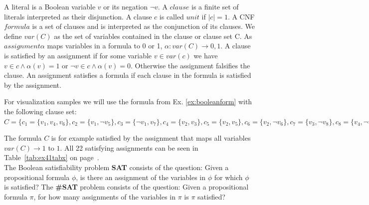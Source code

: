 \documentclass[a4paper, 12pt, bibliography=totoc]{scrartcl}
\begin{document}
A literal is a Boolean variable $v$ or its negation $\neg v$. A $clause$ is a finite set of literals interpreted as their disjunction. A clause $c$ is called $unit$ if $|c|=1$. A CNF $formula$ is a set of clauses and is interpreted as the conjunction of its clauses. We define $var(C)$ as the set of variables contained in the clause or clause set C. As $assignment \alpha$ maps variables in a formula to 0 or 1, $\alpha : var(C)\rightarrow 0,1$. A clause is satisfied by an assignment if for some variable $v \in var(c)$ we have $v \in c \land \alpha (v)=1$ {or} $\neg v \in c \land \alpha(v)=0$. Otherwise the assignment falsifies the clause. An assignment satisfies a formula if each clause in the formula is satisfied by the assignment. \\
\begin{example}\label{ex:example41}
	For visualization samples we will use the formula from Ex. \ref{ex:booleanform} with the following clause set: $C=\{c_{1}=\{v_{1},v_{4},v_{6}\},
	c_{2}=\{v_{1},\neg v_{5}\},
	c_{3}=\{\neg v_{1},v_{7}\},
	c_{4}=\{v_{2},v_{3}\},
	c_{5}=\{v_{2},v_{5}\},
	c_{6}=\{v_{2},\neg v_{6}\},
	c_{7}=\{v_{3},\neg v_{8}\},
	c_{8}=\{v_{4},\neg v_{8}\},
	c_{9}=\{\neg v_{4},v_{6}\},
	c_{10}=\{\neg v_{4},v_{7}\}\}$
\end{example}
\vskip 12pt
The formula $C$ is for example satisfied by the assignment that maps all variables $var(C)\rightarrow 1$ to $1$. 
All 22 satisfying assignments can be seen in Table~\ref{tab:ex41tabx} on page~\pageref{tab:ex41tabx}.\\

The Boolean satisfiability problem \textbf{SAT} consists of the question: Given a propositional formula $\phi$, is there an assignment of the variables in $\phi$ for which $\phi$ is satisfied?
The \textbf{\#SAT} problem consists of the question: Given a propositional formula $\pi$, for how many assignments of the variables in $\pi$ is $\pi$ satisfied?\\
\end{document}
